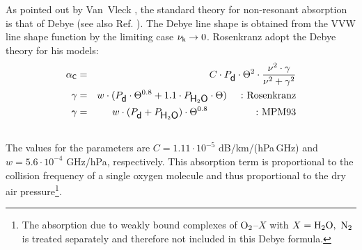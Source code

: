 {
\label{levele:pwr98_o2cont}
As pointed out by Van~Vleck \cite{vv:87}, the standard theory for
non-resonant absorption is that of Debye (see also Ref. \cite{townes:55}). 
The Debye line shape is obtained from the VVW line shape function by
the limiting case $\nu_{\sf k} \rightarrow 0$.
Rosenkranz \cite{pwr:93} adopt the Debye theory for his models: 
\begin{eqnarray}
  \label{eq:pwr_o2cont}
  \alphac &=&  C \cdot \pda \cdot \Theta^2 \cdot 
             \frac{\nu^2 \cdot \gamma}{\nu^2+\gamma^2}\\
%
  \label{eq:pwr_o2cont_1}
  \gamma &=&  w \cdot (\pda \cdot \Theta^{0.8} + 1.1 \cdot \phzo \cdot
  \Theta)\hspace*{5mm}\mbox{:~Rosenkranz}\\
  \label{eq:pwr_o2cont_2}
  \gamma &=&  w \cdot (\pda + \phzo) \cdot \Theta^{0.8}\hspace*{17.25mm}\mbox{:~MPM93}\\
\nonumber
\end{eqnarray}
The values for the parameters are $C = 1.11\cdot 10^{-5}$ dB/km/(hPa\,GHz) and 
$w = 5.6 \cdot 10^{-4}$ GHz/hPa, respectively. This absorption
term is proportional to the collision frequency of a single oxygen molecule
and thus proportional to the dry air pressure\footnote{The absorption
  due to weakly bound complexes of $\mbox{O}_2$--$X$ with $X=\mbox{H}_2\mbox{O},~\mbox{N}_2$ is 
  treated separately and therefore not included in this Debye
  formula.}.




\label{levelb:O2_mpm93}

}
